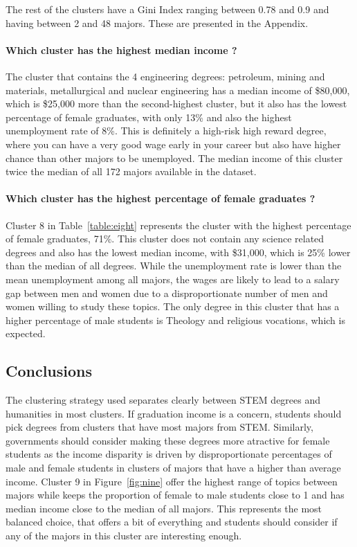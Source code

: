 \documentclass[11pt]{article}
\begin{document}
The rest of the clusters have a Gini Index ranging between 0.78 and 0.9 and having between 2 and 48 majors. These are presented in the Appendix.

\paragraph*{Which cluster has the highest median income ?}
The cluster that contains the 4 engineering degrees: petroleum, mining and materials, metallurgical and nuclear engineering has a median income of \$80,000, which is \$25,000 more than the second-highest cluster, but it also has the lowest percentage of female graduates, with only 13\% and also the highest unemployment rate of 8\%. This is definitely a high-risk high reward degree, where you can have a very good wage early in your career but also have higher chance than other majors to be unemployed. The median income of this cluster twice the median of all 172 majors available in the dataset.

\paragraph*{Which cluster has the highest percentage of female graduates ?}

Cluster 8 in Table~\ref{table:eight} represents the cluster with the highest percentage of female graduates, 71\%. This cluster does not contain any science related degrees and also has the lowest median income, with \$31,000, which is 25\% lower than the median of all degrees. While the unemployment rate is lower than the mean unemployment among all majors, the wages are likely to lead to a salary gap between men and women due to a disproportionate number of men and women willing to study these topics. The only degree in this cluster that has a higher percentage of male students is Theology and religious vocations, which is expected.

\subsection*{Conclusions}
The clustering strategy used separates clearly between STEM degrees and humanities in most clusters. If graduation income is a concern, students should pick degrees from clusters that have most majors from STEM. Similarly, governments should consider making these degrees more atractive for female students as the income disparity is driven by disproportionate percentages of male and female students in clusters of majors that have a higher than average income. Cluster 9 in Figure~\ref{fig:nine} offer the highest range of topics between majors while keeps the proportion of female to male students close to 1 and has median income close to the median of all majors. This represents the most balanced choice, that offers a bit of everything and students should consider if any of the majors in this cluster are interesting enough.
\end{document}
